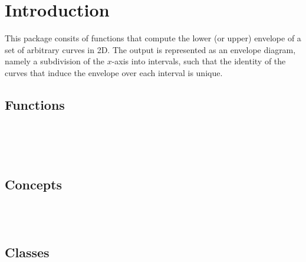 \clearpage
{}
\label{chapterEnvelope2Ref}


\section*{Introduction}
\label{env2_ref_sec:intro}

This package consits of functions that compute the lower (or upper)
envelope of a set of arbitrary curves in 2D. The output is
represented as an envelope diagram, namely a subdivision of the
$x$-axis into intervals, such that the identity of the curves that
induce the envelope over each interval is unique.

\subsection*{Functions}

\\
\\
\\

\subsection*{Concepts}

\\
\\

\subsection*{Classes}



